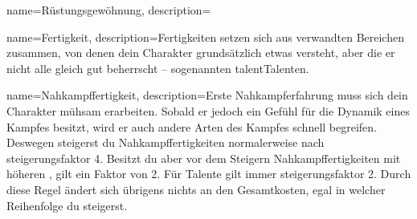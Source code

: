 {
    name={Rüstungsgewöhnung},
    description={}}
        
        
        
        
        
        
        
        
        
        
        
    
        
        
        
        
    

{
    name={Fertigkeit},
    description={Fertigkeiten setzen sich aus verwandten Bereichen zusammen, von denen dein Charakter grundsätzlich etwas versteht, aber die er nicht alle gleich gut beherrscht – sogenannten \gls{talent}{Talenten}.}}

{
    name={Nahkampffertigkeit},
    description={Erste Nahkampferfahrung muss sich dein Charakter mühsam erarbeiten. Sobald er jedoch ein Gefühl für die Dynamik eines Kampfes besitzt, wird er auch andere Arten des Kampfes schnell begreifen. Deswegen steigerst du Nahkampffertigkeiten normalerweise nach \gls{steigerungsfaktor} 4. Besitzt du aber vor dem Steigern Nahkampffertigkeiten mit höheren , gilt ein Faktor von 2. Für Talente gilt immer \gls{steigerungsfaktor} 2. Durch diese Regel ändert sich übrigens nichts an den Gesamtkosten, egal in welcher Reihenfolge du steigerst.}}

